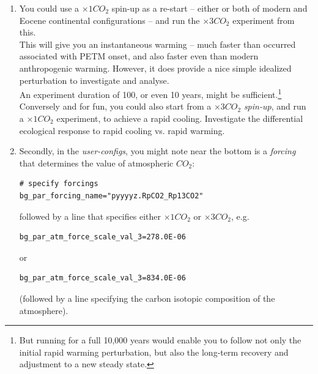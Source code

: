 \begin{enumerate}[noitemsep]

\vspace{1mm}
\item You could use a \(\times1 CO_{2}\) spin-up as a re-start -- either or both of modern and Eocene continental configurations -- and run the \(\times3 CO_{2}\) experiment from this.
\\This will give you an instantaneous warming -- much faster than occurred associated with PETM onset, and also faster even than modern anthropogenic warming. However, it does provide a nice simple idealized perturbation to investigate and analyse.
\\An experiment duration of 100, or even 10 years, might be sufficient.\footnote{But running for a full 10,000 years would enable you to follow not only the initial rapid warming perturbation, but also the long-term recovery and adjustment to a new steady state.}
\\Conversely and for fun, you could also start from a \(\times3 CO_{2}\) \textit{spin-up}, and run a \(\times1 CO_{2}\) experiment, to achieve a rapid cooling. Investigate the differential ecological response to rapid cooling vs. rapid warming.

\vspace{1mm}
\item Secondly, in the \textit{user-configs}, you might note near the bottom is a \textit{forcing} that determines the value of atmospheric \(CO_{2}\):
\vspace{-1mm}\small\begin{verbatim}
# specify forcings
bg_par_forcing_name="pyyyyz.RpCO2_Rp13CO2"
\end{verbatim}\normalsize\vspace{-1mm}
followed by a line that specifies either \(\times1 CO_{2}\) or \(\times3 CO_{2}\), e.g.
\vspace{-1mm}\small\begin{verbatim}
bg_par_atm_force_scale_val_3=278.0E-06
\end{verbatim}\normalsize\vspace{-1mm}
or
\vspace{-1mm}\small\begin{verbatim}
bg_par_atm_force_scale_val_3=834.0E-06
\end{verbatim}\normalsize\vspace{-1mm}
(followed by a line specifying the carbon isotopic composition of the atmosphere).


\end{enumerate}
